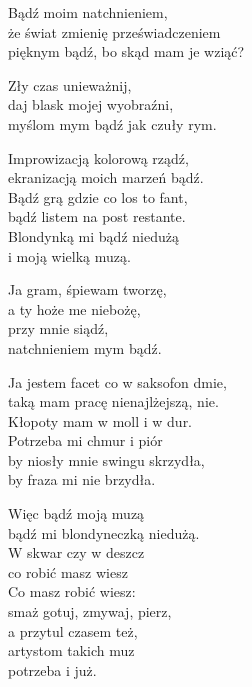 \begin{text}
    Bądź moim natchnieniem,\\
    że świat zmienię przeświadczeniem\\
    pięknym bądź, bo skąd mam je wziąć?

    Zły czas unieważnij,\\
    daj blask mojej wyobraźni,\\
    myślom mym bądź jak czuły rym.

    Improwizacją kolorową rządź,\\
    ekranizacją moich marzeń bądź.\\
    Bądź grą gdzie co los to fant,\\
    bądź listem na post restante.\\
    Blondynką mi bądź niedużą\\
    i moją wielką muzą.

    Ja gram, śpiewam tworzę,\\
    a ty hoże me niebożę,\\
    przy mnie siądź,\\
    natchnieniem mym bądź.

    Ja jestem facet co w saksofon dmie,\\
    taką mam pracę nienajlżejszą, nie.\\
    Kłopoty mam w moll i w dur.\\
    Potrzeba mi chmur i piór\\
    by niosły mnie swingu skrzydła,\\
    by fraza mi nie brzydła.

    Więc bądź moją muzą\\
    bądź mi blondyneczką niedużą.\\
    W skwar czy w deszcz\\
    co robić masz wiesz\\
    Co masz robić wiesz:\\
    smaż gotuj, zmywaj, pierz,\\
    a przytul czasem też,\\
    artystom takich muz\\
    potrzeba i już.
\end{text}
